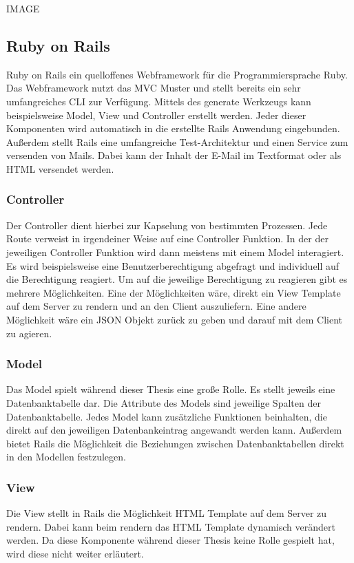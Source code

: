 \documentclass[11pt]{article}
\begin{document}
\begin{flushleft}
			IMAGE
			
			
			\subsection{Ruby on Rails}
			\label{sec: rails}
			Ruby on Rails ein quelloffenes Webframework für die Programmiersprache Ruby. Das Webframework nutzt das MVC Muster und stellt bereits ein sehr umfangreiches CLI zur Verfügung. Mittels des generate Werkzeugs kann beispielsweise Model, View und Controller erstellt werden. Jeder dieser Komponenten wird automatisch in die erstellte Rails Anwendung eingebunden. Außerdem stellt Rails eine umfangreiche Test-Architektur und einen Service zum versenden von Mails. Dabei kann der Inhalt der E-Mail im Textformat oder als HTML versendet werden.
			
			\subsubsection{Controller}
			\label{sec: rails_controller}
			Der Controller dient hierbei zur Kapselung von bestimmten Prozessen. Jede Route verweist in irgendeiner Weise auf eine Controller Funktion. In der der jeweiligen Controller Funktion wird dann meistens mit einem Model interagiert. Es wird beispielsweise eine Benutzerberechtigung abgefragt und individuell auf die Berechtigung reagiert. Um auf die jeweilige Berechtigung zu reagieren gibt es mehrere Möglichkeiten. Eine der Möglichkeiten wäre, direkt ein View Template auf dem Server zu rendern und an den Client auszuliefern. Eine andere Möglichkeit wäre ein JSON Objekt zurück zu geben und darauf mit dem Client zu agieren.
			
			\subsubsection{Model}
			\label{sec: rails_model}
			Das Model spielt während dieser Thesis eine große Rolle. Es stellt jeweils eine Datenbanktabelle dar. Die Attribute des Models sind jeweilige Spalten der Datenbanktabelle. Jedes Model kann zusätzliche Funktionen beinhalten, die direkt auf den jeweiligen Datenbankeintrag angewandt werden kann. Außerdem bietet Rails die Möglichkeit die Beziehungen zwischen Datenbanktabellen direkt in den Modellen festzulegen. 
			
			\subsubsection{View}
			\label{sec: rails_view}
			Die View stellt in Rails die Möglichkeit HTML Template auf dem Server zu rendern. Dabei kann beim rendern das HTML Template dynamisch verändert werden. Da diese Komponente während dieser Thesis keine Rolle gespielt hat, wird diese nicht weiter erläutert.\par\bigskip
			

\end{flushleft}
\end{document}
